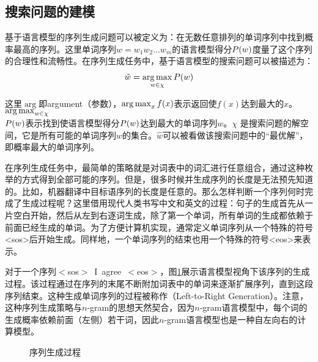 
\subsection{搜索问题的建模}

\parinterval 基于语言模型的序列生成问题可以被定义为：在无数任意排列的单词序列中找到概率最高的序列。这里单词序列$w = w_1 w_2 \ldots w_m$的语言模型得分${P}(w)$度量了这个序列的合理性和流畅性。在序列生成任务中，基于语言模型的搜索问题可以被描述为：
\begin{eqnarray}
\hat{w} = \operatorname*{arg\,max}_{w \in \chi}{P}(w)
\label{eq:2-42}
\end{eqnarray}

\noindent 这里$\arg$即argument（参数），$\operatorname*{arg\,max}_x f(x)$表示返回使$f(x)$达到最大的$x$。$\operatorname*{arg\,max}_{w \in \chi}$\\${P}(w)$表示找到使语言模型得分${P}(w)$达到最大的单词序列$w$。$\chi$ 是搜索问题的解空间，它是所有可能的单词序列$w$的集合。$\hat{w}$可以被看做该搜索问题中的“最优解”，即概率最大的单词序列。

\parinterval 在序列生成任务中，最简单的策略就是对词表中的词汇进行任意组合，通过这种枚举的方式得到全部可能的序列。但是，很多时候并生成序列的长度是无法预先知道的。比如，机器翻译中目标语序列的长度是任意的。那么怎样判断一个序列何时完成了生成过程呢？这里借用现代人类书写中文和英文的过程：句子的生成首先从一片空白开始，然后从左到右逐词生成，除了第一个单词，所有单词的生成都依赖于前面已经生成的单词。为了方便计算机实现，通常定义单词序列从一个特殊的符号<sos>后开始生成。同样地，一个单词序列的结束也用一个特殊的符号<eos>来表示。

\parinterval 对于一个序列$<$sos$>$\ I\ agree\ $<$eos$>$，图\ref{fig:2-13}展示语言模型视角下该序列的生成过程。该过程通过在序列的末尾不断附加词表中的单词来逐渐扩展序列，直到这段序列结束。这种生成单词序列的过程被称作{\small{}}（Left-to-Right Generation）。注意，这种序列生成策略与$n$-gram的思想天然契合，因为$n$-gram语言模型中，每个词的生成概率依赖前面（左侧）若干词，因此$n$-gram语言模型也是一种自左向右的计算模型。

\begin{figure}[htp]
    \centering
 	
	\caption{序列生成过程}
    \label{fig:2-13}
\end{figure}

